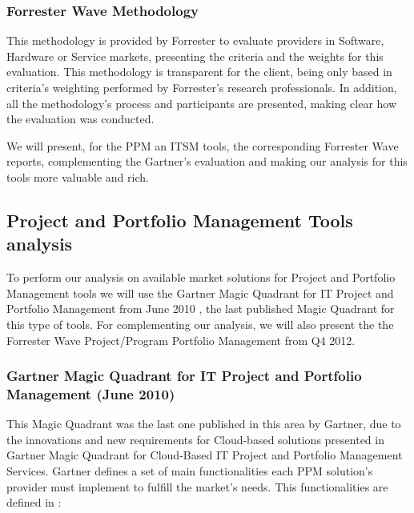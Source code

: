 \subsubsection{Forrester Wave Methodology}

This methodology\cite{ForresterWave} is provided by Forrester to evaluate providers in Software, Hardware or Service markets, presenting the criteria and the weights for this evaluation. This methodology is transparent for the client, being only based in criteria's weighting performed by Forrester's research professionals. In addition, all the methodology's process and participants are presented, making clear how the evaluation was conducted.\par
We will present, for the PPM an ITSM tools, the corresponding Forrester Wave reports, complementing the Gartner's evaluation and making our analysis for this tools more valuable and rich.\par 

\subsection{Project and Portfolio Management Tools analysis}

To perform our analysis on available market solutions for Project and Portfolio Management tools we will use the Gartner Magic Quadrant for IT Project and Portfolio Management from June 2010 \cite{magicQuadrantPPM}, the last published Magic Quadrant for this type of tools. For complementing our analysis, we will also present the the Forrester Wave Project/Program Portfolio Management from Q4 2012.\cite{forresterWavePPM}\par 

\subsubsection{Gartner Magic Quadrant for IT Project and Portfolio Management (June 2010)}

This Magic Quadrant was the last one published in this area by Gartner, due to the innovations and new requirements for Cloud-based solutions presented in Gartner Magic Quadrant for Cloud-Based IT Project and Portfolio Management Services\cite{magicQuadrantCloud}.
Gartner defines a set of main functionalities each PPM solution's provider must implement to fulfill the market's needs. This functionalities are defined in \cite{magicQuadrantPPM}:

